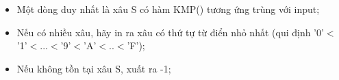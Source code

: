 \begin{itemize}
	\item     Một dòng duy nhất là xâu S có hàm KMP() tương ứng trùng với input;   
	\item     Nếu có nhiều xâu, hãy in ra xâu có thứ tự từ điển nhỏ nhất (qui định '0'$<$'1'$<$...$<$'9'$<$'A'$<$..$<$'F');   
	\item     Nếu không tồn tại xâu S, xuất ra -1;   
\end{itemize}